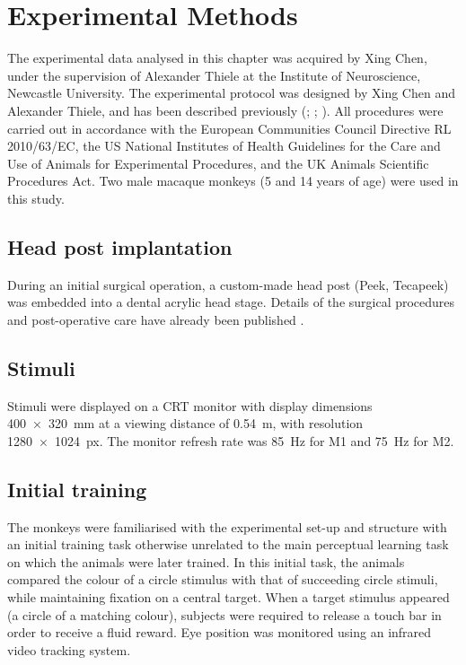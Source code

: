 \section{Experimental Methods}
\label{ch:exp}

The experimental data analysed in this chapter was acquired by Xing Chen, under the supervision of Alexander Thiele at the Institute of Neuroscience, Newcastle University.
The experimental protocol was designed by Xing Chen and Alexander Thiele, and has been described previously (\citealp{Chen2013thesis}; \citealp{Chen2013}; \citealp{Chen2014}). %
All procedures were carried out in accordance with the European Communities Council Directive RL 2010/63/EC, the US National Institutes of Health Guidelines for the Care and Use of Animals for Experimental Procedures, and the UK Animals Scientific Procedures Act.
Two male macaque monkeys (\num{5} and \num{14} years of age) were used in this study.


\subsection{Head post implantation}

During an initial surgical operation, a custom-made head post (Peek, Tecapeek) was embedded into a dental acrylic head stage.
Details of the surgical procedures and post-operative care have already been published \citep[see][for details]{Thiele2006}.


\subsection{Stimuli}

Stimuli were displayed on a \ac{CRT} monitor with display dimensions \SI{400x320}{\milli\metre} at a viewing distance of \SI{0.54}{\metre}, with resolution \SI{1280x1024}{px}.
The monitor refresh rate was \SI{85}{Hz} for \ac{M1} and \SI{75}{Hz} for \ac{M2}.


\subsection{Initial training}

The monkeys were familiarised with the experimental set-up and structure with an initial training task otherwise unrelated to the main perceptual learning task on which the animals were later trained.
In this initial task, the animals compared the colour of a circle stimulus with that of succeeding circle stimuli, while maintaining fixation on a central target.
When a target stimulus appeared (a circle of a matching colour), subjects were required to release a touch bar in order to receive a fluid reward.
Eye position was monitored using an infrared video tracking system.%


